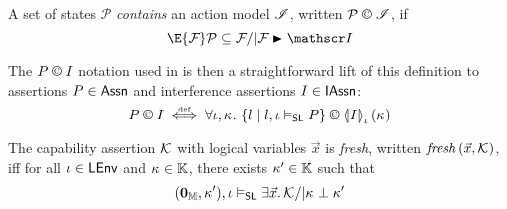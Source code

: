 \begin{definition}
A set of states $\mathcal P$ \emph{contains} an action model $\mathscr{I}$, written $\mathcal P \containI \lmod$, if
%
\[
  \E{\fence{}} \mathcal P\subseteq \fence{} /| \fence{} \strictfences \lmod
\]
\end{definition}
%
The $P\containI I$ notation used in \extendRule is then a straightforward lift of this definition to assertions $P \in \textsf{Assn}$ and interference assertions $I \in \textsf{IAssn}$:
%
\[
	P \containI I \iffdef \for{\lenv, \ca{}} \left\{l \mid l, \lenv \slsat P \right\} \containI \semI[\lenv]{I}(\ca{})
\]
%
\begin{definition}[Freshness]
The capability assertion $\mathcal{K}_{}$ with logical variables $\vec{x}$ is \emph{fresh}, written $\mathit{fresh}\left(\vec{x}, \mathcal{K}_{}\right)$, iff for all $\iota \in \textsf{LEnv}$ and $\kappa_{} \in \mathbb{K}$, there exists $\kappa_{}' \in \mathbb{K}$ such that
%
\[
	(\mathbf{0}_{\mathbb{M}}, \kappa_{}'), \iota \mathrel{\vDash_{\mathsf{SL}}} \exists \vec{x}.\, \mathcal{K}_{} /|  \kappa_{} \mathrel{\bot} \kappa_{}'
\]
%	
%
%
\end{definition}
%
%
